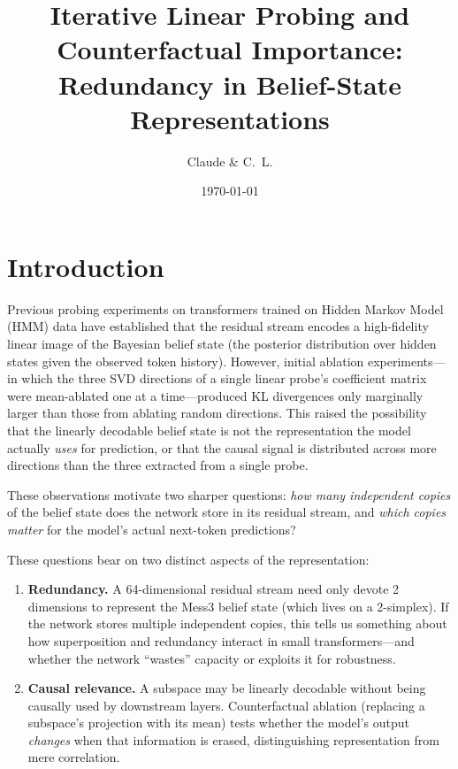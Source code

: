 \documentclass[11pt]{article}
\title{Iterative Linear Probing and Counterfactual Importance:\\
       Redundancy in Belief-State Representations}
\author{Claude \& C.~L.}
\date{\today}
\begin{document}
\maketitle
\tableofcontents
\bigskip

\section{Introduction}
\label{sec:intro}

Previous probing experiments on transformers trained on Hidden Markov Model (HMM) data have established that the residual stream encodes a high-fidelity linear image of the Bayesian belief state (the posterior distribution over hidden states given the observed token history).  However, initial ablation experiments---in which the three SVD directions of a single linear probe's coefficient matrix were mean-ablated one at a time---produced KL divergences only marginally larger than those from ablating random directions.  This raised the possibility that the linearly decodable belief state is not the representation the model actually \emph{uses} for prediction, or that the causal signal is distributed across more directions than the three extracted from a single probe.

These observations motivate two sharper questions: \emph{how many independent copies} of the belief state does the network store in its residual stream, and \emph{which copies matter} for the model's actual next-token predictions?

These questions bear on two distinct aspects of the representation:

\begin{enumerate}
  \item \textbf{Redundancy.}  A 64-dimensional residual stream need only devote 2 dimensions to represent the Mess3 belief state (which lives on a 2-simplex).  If the network stores multiple independent copies, this tells us something about how superposition and redundancy interact in small transformers---and whether the network ``wastes'' capacity or exploits it for robustness.
  \item \textbf{Causal relevance.}  A subspace may be linearly decodable without being causally used by downstream layers.  Counterfactual ablation (replacing a subspace's projection with its mean) tests whether the model's output \emph{changes} when that information is erased, distinguishing representation from mere correlation.
\end{enumerate}
\end{document}
